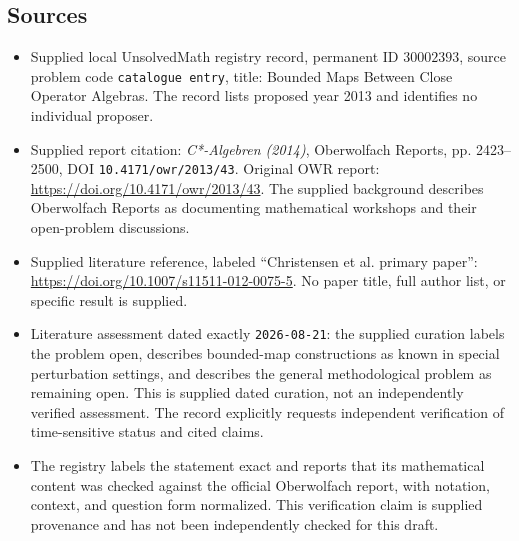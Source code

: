 \documentclass[11pt]{article}
\begin{document}
\subsection{Sources}
\begin{itemize}
\item Supplied local UnsolvedMath registry record, permanent ID \(30002393\), source problem code \texttt{catalogue entry}, title: Bounded Maps Between Close Operator Algebras. The record lists proposed year 2013 and identifies no individual proposer.
\item Supplied report citation: \emph{C*-Algebren (2014)}, Oberwolfach Reports, pp. 2423--2500, DOI \texttt{10.4171/owr/2013/43}. Original OWR report: \url{https://doi.org/10.4171/owr/2013/43}. The supplied background describes Oberwolfach Reports as documenting mathematical workshops and their open-problem discussions.
\item Supplied literature reference, labeled ``Christensen et al. primary paper'': \url{https://doi.org/10.1007/s11511-012-0075-5}. No paper title, full author list, or specific result is supplied.
\item Literature assessment dated exactly \texttt{2026-08-21}: the supplied curation labels the problem open, describes bounded-map constructions as known in special perturbation settings, and describes the general methodological problem as remaining open. This is supplied dated curation, not an independently verified assessment. The record explicitly requests independent verification of time-sensitive status and cited claims.
\item The registry labels the statement exact and reports that its mathematical content was checked against the official Oberwolfach report, with notation, context, and question form normalized. This verification claim is supplied provenance and has not been independently checked for this draft.
\end{itemize}
\end{document}
